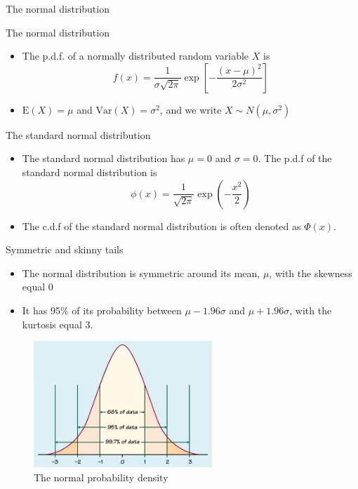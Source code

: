 \documentclass[presentation]{beamer}
\begin{document}
\begin{frame}[label={sec:orgb489736}]{The normal distribution}
\begin{block}{The normal distribution}
\begin{itemize}
\item The p.d.f. of a normally distributed random variable \(X\) is
\[ f(x) =
  \frac{1}{\sigma\sqrt{2\pi}}\exp\left[-\frac{(x-\mu)^{2}}{2\sigma^{2}}\right]
  \]
\item \(\mathrm{E}(X) = \mu\) and \(\mathrm{Var}(X) = \sigma^{2}\), and we write \(X \sim N(\mu, \sigma^{2})\)
\end{itemize}
\end{block}

\begin{block}{The standard normal distribution}
\begin{itemize}
\item The standard normal distribution has \(\mu = 0\) and \(\sigma = 0\). The p.d.f of the
standard normal distribution is
\[
  \phi(x) = \frac{1}{\sqrt{2\pi}}\exp\left(-\frac{x^2}{2}\right)
  \]
\item The c.d.f of the standard normal distribution is often denoted as
\(\Phi(x)\).
\end{itemize}
\end{block}
\end{frame}

\begin{frame}[label={sec:org315fa4e}]{Symmetric and skinny tails}
\begin{itemize}
\item The normal distribution is symmetric around its mean, \(\mu\), with the
skewness equal 0
\item It has 95\% of its probability between
\(\mu-1.96\sigma\) and \(\mu+1.96\sigma\), with the kurtosis
equal 3.
\end{itemize}

\begin{figure}[htbp]
\centering
\includegraphics[width=0.6\textwidth]{figure/Normal-distribution-curve.jpg}
\caption{\label{fig:org89719da}
The normal probability density}
\end{figure}
\end{frame}
\end{document}
